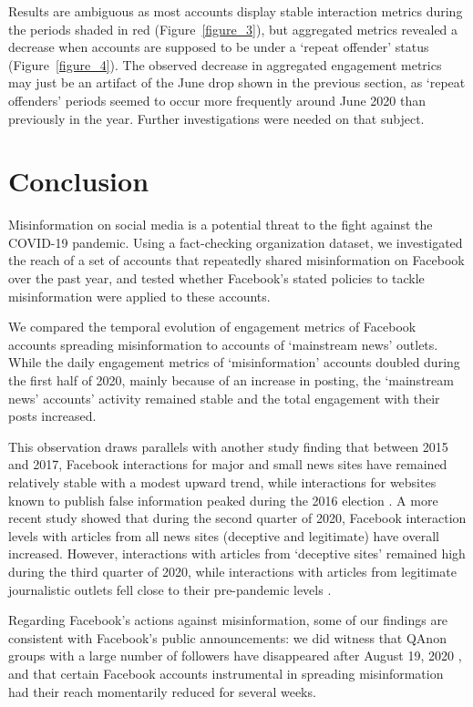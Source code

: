 \documentclass[sigconf]{acmart}
\begin{document}
Results are ambiguous as most accounts display stable interaction metrics during the periods shaded in red (Figure~\ref{figure_3}), but aggregated metrics revealed a decrease when accounts are supposed to be under a `repeat offender' status (Figure~\ref{figure_4}). The observed decrease in aggregated engagement metrics may just be an artifact of the June drop shown in the previous section, as `repeat offenders' periods seemed to occur more frequently around June 2020 than previously in the year. Further investigations were needed on that subject.

\section{Conclusion}

Misinformation on social media is a potential threat to the fight against the COVID-19 pandemic. Using a fact-checking organization dataset, we investigated the reach of a set of accounts that repeatedly shared misinformation on Facebook over the past year, and tested whether Facebook's stated policies to tackle misinformation were applied to these accounts. 

We compared the temporal evolution of engagement metrics of Facebook accounts spreading misinformation to accounts of `mainstream news' outlets. While the daily engagement metrics of `misinformation' accounts doubled during the first half of 2020, mainly because of an increase in posting, the `mainstream news' accounts' activity remained stable and the total engagement with their posts increased. 

This observation draws parallels with another study finding that between 2015 and 2017, Facebook interactions for major and small news sites have remained relatively stable with a modest upward trend, while interactions for websites known to publish false information peaked during the 2016 election \cite{allcott2019trends}. A more recent study showed that during the second quarter of 2020, Facebook interaction levels with articles from all news sites (deceptive and legitimate) have overall increased. However, interactions with articles from `deceptive sites' remained high during the third quarter of 2020, while interactions with articles from legitimate journalistic outlets fell close to their pre-pandemic levels \cite{KornbluhPandemic}. 

Regarding Facebook's actions against misinformation, some of our findings are consistent with Facebook's public announcements: we did witness that QAnon groups with a large number of followers have disappeared after August 19, 2020 \cite{FacebookQAnon}, and that certain Facebook accounts instrumental in spreading misinformation had their reach momentarily reduced for several weeks.
\end{document}
